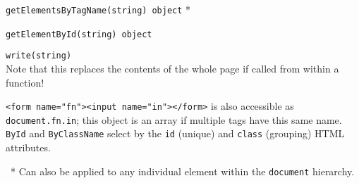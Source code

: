 \documentclass[12pt,letterpaper]{article}
\begin{document}
\begin{multicols}{2}
{{		\texttt{getElementsByTagName(string)}{\scriptsize \textrightarrow\ \texttt{object} *}

		\texttt{getElementById(string)}{\scriptsize \textrightarrow\ \texttt{object}}

		\texttt{write(string)}
		\\
		\hspace*{1em} Note that this replaces the contents of the whole page if called from within a function!

		\vspace{6pt}
		{\small
			\texttt{<form name="fn"><input~name="in"></form>} is also accessible as \texttt{document.fn.in}; this object is an array if multiple tags have this same name.
			\texttt{ById} and \texttt{ByClassName} select by the \texttt{id} (unique) and \texttt{class} (grouping) HTML attributes.

			\ * Can also be applied to any individual element within the \texttt{document} hierarchy.
		}
	}
}

\hfill

\end{multicols}
\end{document}

